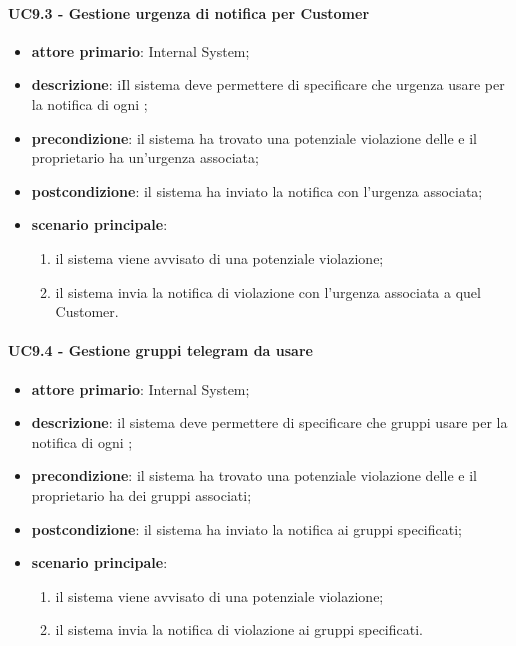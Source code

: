 \paragraph{UC9.3 -  Gestione urgenza di notifica per Customer}
\begin{itemize}
	\item \textbf{attore primario}: Internal System;
	\item \textbf{descrizione}: iIl sistema deve permettere di specificare che urgenza usare per la notifica di ogni ; 
	\item \textbf{precondizione}: il sistema ha trovato una potenziale violazione delle  e il  proprietario ha un'urgenza associata;
	\item \textbf{postcondizione}: il sistema ha inviato la notifica con l'urgenza associata;
	\item \textbf{scenario principale}: 
	\begin{enumerate}
		\item il sistema viene avvisato di una potenziale violazione;
		\item il sistema invia la notifica di violazione con l'urgenza associata a quel Customer.
	\end{enumerate}
\end{itemize}
\paragraph{UC9.4 -  Gestione gruppi telegram da usare}
\begin{itemize}
	\item \textbf{attore primario}: Internal System;
	\item \textbf{descrizione}: il sistema deve permettere di specificare che gruppi  usare per la notifica di ogni ; 
	\item \textbf{precondizione}: il sistema ha trovato una potenziale violazione delle  e il  proprietario ha dei gruppi  associati;
	\item \textbf{postcondizione}: il sistema ha inviato la notifica ai gruppi specificati;
	\item \textbf{scenario principale}: 
	\begin{enumerate}
		\item il sistema viene avvisato di una potenziale violazione;
		\item il sistema invia la notifica di violazione ai gruppi specificati.
	\end{enumerate}
\end{itemize}
